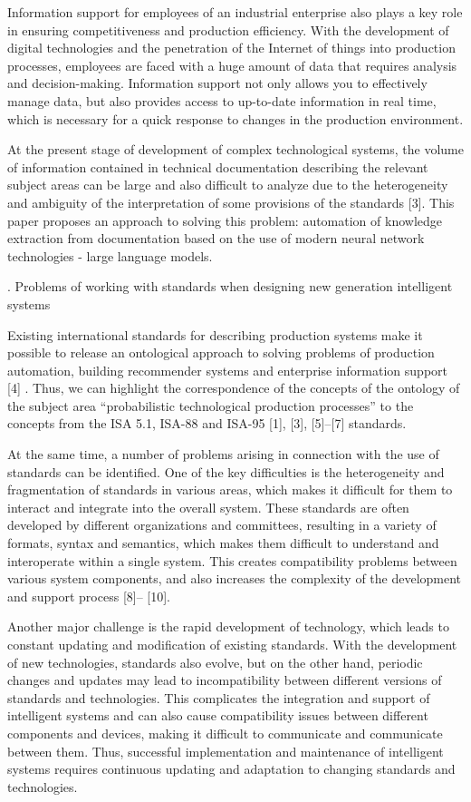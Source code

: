 \documentclass{article}
\begin{document}
\begin{SCn}
\begin{multicols}
Information support for employees of an industrial
enterprise also plays a key role in ensuring competitiveness and production efficiency. With the development of
digital technologies and the penetration of the Internet
of things into production processes, employees are faced
with a huge amount of data that requires analysis and
decision-making. Information support not only allows
you to effectively manage data, but also provides access
to up-to-date information in real time, which is necessary for a quick response to changes in the production
environment.

At the present stage of development of complex technological systems, the volume of information contained in
technical documentation describing the relevant subject
areas can be large and also difficult to analyze due to
the heterogeneity and ambiguity of the interpretation of
some provisions of the standards [3].
This paper proposes an approach to solving this problem: automation of knowledge extraction from documentation based on the use of modern neural network
technologies - large language models.
\begin{center}
{\MakeUppercase{.}}
Problems of working with standards when designing
new generation intelligent systems
\end{center}

Existing international standards for describing production systems make it possible to release an ontological
approach to solving problems of production automation,
building recommender systems and enterprise information support [4] . Thus, we can highlight the correspondence of the concepts of the ontology of the subject area
“probabilistic technological production processes” to the
concepts from the ISA 5.1, ISA-88 and ISA-95 [1], [3],
[5]–[7] standards.

At the same time, a number of problems arising in
connection with the use of standards can be identified.
One of the key difficulties is the heterogeneity and
fragmentation of standards in various areas, which makes
it difficult for them to interact and integrate into the
overall system. These standards are often developed by
different organizations and committees, resulting in a
variety of formats, syntax and semantics, which makes
them difficult to understand and interoperate within a
single system. This creates compatibility problems between various system components, and also increases the
complexity of the development and support process [8]–
[10].

Another major challenge is the rapid development
of technology, which leads to constant updating and
modification of existing standards. With the development
of new technologies, standards also evolve, but on the
other hand, periodic changes and updates may lead to
incompatibility between different versions of standards
and technologies. This complicates the integration and
support of intelligent systems and can also cause compatibility issues between different components and devices,
making it difficult to communicate and communicate between them. Thus, successful implementation and maintenance of intelligent systems requires continuous updating
and adaptation to changing standards and technologies.


\end{multicols}
\end{SCn}
\end{document}
